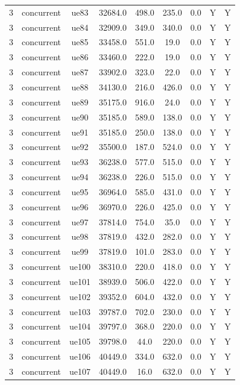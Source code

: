 \begin{table}[ht]
\begin{tabular}{|c|c|c|c|c|c|c|c|c|}
3 & concurrent & ue83 & 32684.0 & 498.0 & 235.0 & 0.0 & Y & Y \\
3 & concurrent & ue84 & 32909.0 & 349.0 & 340.0 & 0.0 & Y & Y \\
3 & concurrent & ue85 & 33458.0 & 551.0 & 19.0 & 0.0 & Y & Y \\
3 & concurrent & ue86 & 33460.0 & 222.0 & 19.0 & 0.0 & Y & Y \\
3 & concurrent & ue87 & 33902.0 & 323.0 & 22.0 & 0.0 & Y & Y \\
3 & concurrent & ue88 & 34130.0 & 216.0 & 426.0 & 0.0 & Y & Y \\
3 & concurrent & ue89 & 35175.0 & 916.0 & 24.0 & 0.0 & Y & Y \\
3 & concurrent & ue90 & 35185.0 & 589.0 & 138.0 & 0.0 & Y & Y \\
3 & concurrent & ue91 & 35185.0 & 250.0 & 138.0 & 0.0 & Y & Y \\
3 & concurrent & ue92 & 35500.0 & 187.0 & 524.0 & 0.0 & Y & Y \\
3 & concurrent & ue93 & 36238.0 & 577.0 & 515.0 & 0.0 & Y & Y \\
3 & concurrent & ue94 & 36238.0 & 226.0 & 515.0 & 0.0 & Y & Y \\
3 & concurrent & ue95 & 36964.0 & 585.0 & 431.0 & 0.0 & Y & Y \\
3 & concurrent & ue96 & 36970.0 & 226.0 & 425.0 & 0.0 & Y & Y \\
3 & concurrent & ue97 & 37814.0 & 754.0 & 35.0 & 0.0 & Y & Y \\
3 & concurrent & ue98 & 37819.0 & 432.0 & 282.0 & 0.0 & Y & Y \\
3 & concurrent & ue99 & 37819.0 & 101.0 & 283.0 & 0.0 & Y & Y \\
3 & concurrent & ue100 & 38310.0 & 220.0 & 418.0 & 0.0 & Y & Y \\
3 & concurrent & ue101 & 38939.0 & 506.0 & 422.0 & 0.0 & Y & Y \\
3 & concurrent & ue102 & 39352.0 & 604.0 & 432.0 & 0.0 & Y & Y \\
3 & concurrent & ue103 & 39787.0 & 702.0 & 230.0 & 0.0 & Y & Y \\
3 & concurrent & ue104 & 39797.0 & 368.0 & 220.0 & 0.0 & Y & Y \\
3 & concurrent & ue105 & 39798.0 & 44.0 & 220.0 & 0.0 & Y & Y \\
3 & concurrent & ue106 & 40449.0 & 334.0 & 632.0 & 0.0 & Y & Y \\
3 & concurrent & ue107 & 40449.0 & 16.0 & 632.0 & 0.0 & Y & Y \\

\end{tabular}
\end{table}
